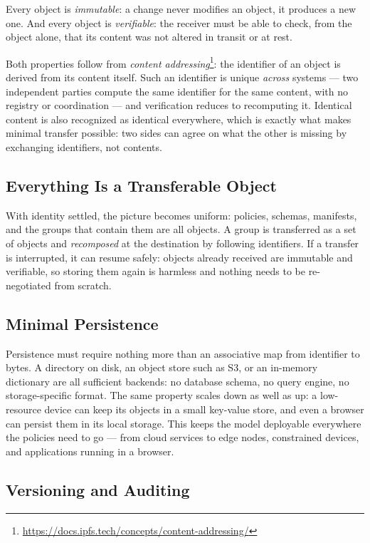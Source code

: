 \documentclass[11pt,a4paper]{article}
\newcommand{\term}[1]{\emph{#1}}                 %
\begin{document}
Every object is \term{immutable}: a change never modifies an object, it
produces a new one. And every object is \term{verifiable}: the receiver
must be able to check, from the object alone, that its content was not
altered in transit or at rest.

Both properties follow from \term{content
addressing}\footnote{\url{https://docs.ipfs.tech/concepts/content-addressing/}}:
the identifier of an object is derived from its content itself. Such an
identifier is unique \emph{across} systems --- two independent parties
compute the same identifier for the same content, with no registry or
coordination --- and verification reduces to recomputing it. Identical
content is also recognized as identical everywhere, which is exactly what
makes minimal transfer possible: two sides can agree on what the other is
missing by exchanging identifiers, not contents.

\subsection{Everything Is a Transferable Object}

With identity settled, the picture becomes uniform: policies, schemas,
manifests, and the groups that contain them are all objects. A group is
transferred as a set of objects and \term{recomposed} at the destination
by following identifiers. If a transfer is interrupted, it can resume
safely: objects already received are immutable and verifiable, so storing
them again is harmless and nothing needs to be re-negotiated from
scratch.

\subsection{Minimal Persistence}

Persistence must require nothing more than an associative map from
identifier to bytes. A directory on disk, an object store such as S3, or
an in-memory dictionary are all sufficient backends: no database schema,
no query engine, no storage-specific format. The same property scales
down as well as up: a low-resource device can keep its objects in a small
key-value store, and even a browser can persist them in its local
storage. This keeps the model deployable everywhere the policies need to
go --- from cloud services to edge nodes, constrained devices, and
applications running in a browser.

\subsection{Versioning and Auditing}
\end{document}
